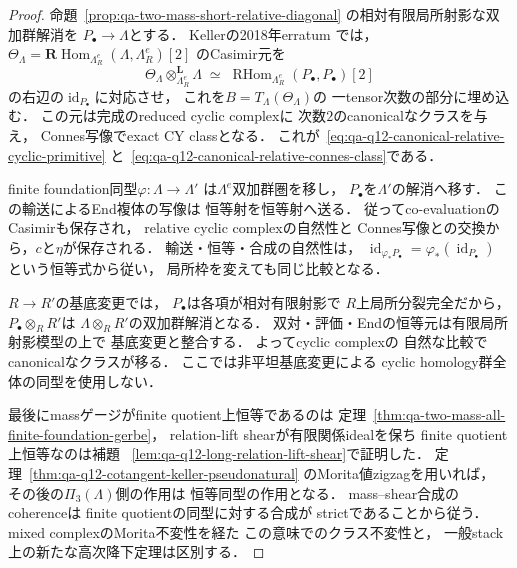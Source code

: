 \begin{proof}
命題~\ref{prop:qa-two-mass-short-relative-diagonal}
の相対有限局所射影な双加群解消を
$P_\bullet\to\Lambda$とする．
Kellerの2018年erratum
\cite[Theorem~1.1の証明，pp.~2--3]{KellerErratumCY2018}
では，
$\Theta_\Lambda=
 \mathbf R\operatorname{Hom}_{\Lambda_R^e}
            (\Lambda,\Lambda_R^e)[2]$
のCasimir元を
\[
 \Theta_\Lambda\otimes_{\Lambda_R^e}^{\mathbf L}
               \Lambda
 \;\simeq\;
 \operatorname{RHom}_{\Lambda_R^e}
               (P_\bullet,P_\bullet)[2]
 \tag{EC}\label{eq:qa-q12-exact-cy-diagonal-identity}
\]
の右辺の$\operatorname{id}_{P_\bullet}$に対応させ，
これを$B=T_\Lambda(\Theta_\Lambda)$の
一tensor次数の部分に埋め込む．
この元は完成のreduced cyclic complexに
次数$2$のcanonicalなクラスを与え，
Connes写像でexact CY classとなる．
これが~\eqref{eq:qa-q12-canonical-relative-cyclic-primitive}
と~\eqref{eq:qa-q12-canonical-relative-connes-class}である．

finite foundation同型$\varphi:\Lambda\to\Lambda'$
は$\Lambda^e$双加群圏を移し，
$P_\bullet$を$\Lambda'$の解消へ移す．
この輸送によるEnd複体の写像は
恒等射を恒等射へ送る．
従ってco-evaluationのCasimirも保存され，
relative cyclic complexの自然性と
Connes写像との交換から，$c$と$\eta$が保存される．
輸送・恒等・合成の自然性は，
$\operatorname{id}_{\varphi_*P_\bullet}
=\varphi_*(\operatorname{id}_{P_\bullet})$
という恒等式から従い，
局所枠を変えても同じ比較となる．

$R\to R'$の基底変更では，
$P_\bullet$は各項が相対有限射影で
$R$上局所分裂完全だから，
$P_\bullet\otimes_RR'$は
$\Lambda\otimes_RR'$の双加群解消となる．
双対・評価・Endの恒等元は有限局所射影模型の上で
基底変更と整合する．
よってcyclic complexの
自然な比較でcanonicalなクラスが移る．
ここでは非平坦基底変更による
cyclic homology群全体の同型を使用しない．

最後にmassゲージがfinite quotient上恒等であるのは
定理~\ref{thm:qa-two-mass-all-finite-foundation-gerbe}，
relation-lift shearが有限関係idealを保ち
finite quotient上恒等なのは補題~
\ref{lem:qa-q12-long-relation-lift-shear}で証明した．
定理~\ref{thm:qa-q12-cotangent-keller-pseudonatural}
のMorita値zigzagを用いれば，
その後の$\Pi_3(\Lambda)$側の作用は
恒等同型の作用となる．
mass--shear合成のcoherenceは
finite quotientの同型に対する合成が
strictであることから従う．
mixed complexのMorita不変性を経た
この意味でのクラス不変性と，
一般stack上の新たな高次降下定理は区別する．
\end{proof}


